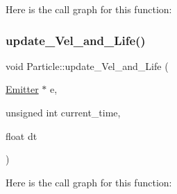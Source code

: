 Here is the call graph for this function\+:
\mbox{\label{namespace_particle_a2d4aa3c262a1ff4635de500febe51eff}} 
\subsubsection{\texorpdfstring{update\+\_\+\+Vel\+\_\+and\+\_\+\+Life()}{update\_Vel\_and\_Life()}}
{\footnotesize\ttfamily void Particle\+::update\+\_\+\+Vel\+\_\+and\+\_\+\+Life (\begin{DoxyParamCaption}\item[{\mbox{\hyperlink{struct_particle_1_1_emitter}{Emitter}} $\ast$}]{e,  }\item[{unsigned int}]{current\+\_\+time,  }\item[{float}]{dt }\end{DoxyParamCaption})}

Here is the call graph for this function\+:

